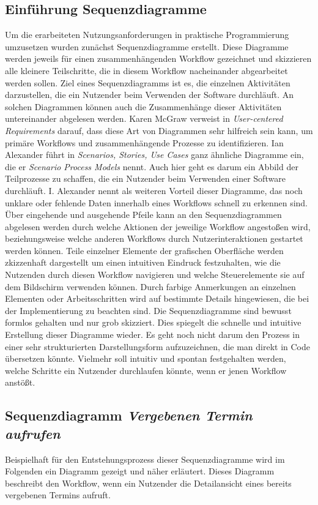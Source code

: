 \subsection*{Einführung Sequenzdiagramme}
Um die erarbeiteten Nutzungsanforderungen in praktische Programmierung
umzusetzen wurden zunächst Sequenzdiagramme erstellt. Diese Diagramme werden
jeweils für einen zusammenhängenden Workflow gezeichnet und skizzieren alle
kleinere Teilschritte, die in diesem Workflow nacheinander abgearbeitet werden
sollen. Ziel eines Sequenzdiagramms ist es, die einzelnen Aktivitäten
darzustellen, die ein Nutzender beim Verwenden der Software
durchläuft\cite{holtzblattCDEvolved}. An solchen Diagrammen können auch die
Zusammenhänge dieser Aktivitäten untereinander abgelesen werden. Karen McGraw
verweist in \textit{User-centered Requirements} darauf, dass diese Art von
Diagrammen sehr hilfreich sein kann, um primäre Workflows und zusammenhängende
Prozesse zu identifizieren\cite{sequenceDiagrams}. Ian Alexander führt in
\textit{Scenarios, Stories, Use Cases} ganz ähnliche Diagramme ein, die er
\textit{Scenario Process Models} nennt. Auch hier geht es darum ein Abbild der
Teilprozesse zu schaffen, die ein Nutzender beim Verwenden einer Software
durchläuft. I. Alexander nennt als weiteren Vorteil dieser Diagramme, das noch
unklare oder fehlende Daten innerhalb eines Workflows schnell zu erkennen sind.
Über eingehende und ausgehende Pfeile kann an den Sequenzdiagrammen abgelesen
werden durch welche Aktionen der jeweilige Workflow angestoßen wird,
beziehungsweise welche anderen Workflows durch Nutzerinteraktionen gestartet
werden können. Teile einzelner Elemente der grafischen Oberfläche werden
zkizzenhaft dargestellt um einen intuitiven Eindruck festzuhalten, wie die
Nutzenden durch diesen Workflow navigieren und welche Steuerelemente sie auf
dem Bildschirm verwenden können. Durch farbige Anmerkungen an einzelnen
Elementen oder Arbeitsschritten wird auf bestimmte Details hingewiesen, die bei
der Implementierung zu beachten sind. Die Sequenzdiagramme sind bewusst formlos
gehalten und nur grob skizziert. Dies spiegelt die schnelle und intuitive
Erstellung dieser Diagramme wieder. Es geht noch nicht darum den Prozess in
einer sehr strukturierten Darstellungsform aufzuzeichnen, die man direkt in
Code übersetzen könnte. Vielmehr soll intuitiv und spontan festgehalten werden,
welche Schritte ein Nutzender durchlaufen könnte, wenn er jenen Workflow
anstößt.

\subsection*{Sequenzdiagramm \textit{Vergebenen Termin aufrufen}}
Beispielhaft für den Entstehungsprozess dieser Sequenzdiagramme wird im
Folgenden ein Diagramm gezeigt und näher erläutert. Dieses Diagramm beschreibt
den Workflow, wenn ein Nutzender die Detailansicht eines bereits vergebenen
Termins aufruft.

